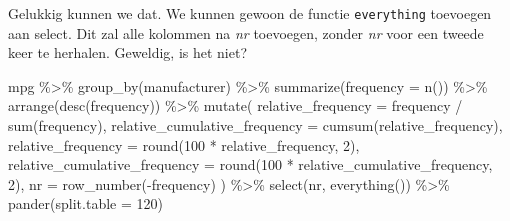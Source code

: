 \documentclass[]{tufte-book}
\newenvironment{Shaded}{}{}
\newcommand{\AttributeTok}[1]{\textcolor[rgb]{0.49,0.56,0.16}{#1}}
\newcommand{\DecValTok}[1]{\textcolor[rgb]{0.25,0.63,0.44}{#1}}
\newcommand{\FunctionTok}[1]{\textcolor[rgb]{0.02,0.16,0.49}{#1}}
\newcommand{\NormalTok}[1]{#1}
\newcommand{\SpecialCharTok}[1]{\textcolor[rgb]{0.25,0.44,0.63}{#1}}
\begin{document}
Gelukkig kunnen we dat. We kunnen gewoon de functie \texttt{everything} toevoegen aan select. Dit zal alle kolommen na \emph{nr} toevoegen, zonder \emph{nr} voor een tweede keer te herhalen. Geweldig, is het niet?

\begin{Shaded}
\begin{Highlighting}[]
\NormalTok{mpg }\SpecialCharTok{\%\textgreater{}\%}
  \FunctionTok{group\_by}\NormalTok{(manufacturer) }\SpecialCharTok{\%\textgreater{}\%}
  \FunctionTok{summarize}\NormalTok{(}\AttributeTok{frequency =} \FunctionTok{n}\NormalTok{()) }\SpecialCharTok{\%\textgreater{}\%}
  \FunctionTok{arrange}\NormalTok{(}\FunctionTok{desc}\NormalTok{(frequency)) }\SpecialCharTok{\%\textgreater{}\%}
  \FunctionTok{mutate}\NormalTok{(}
    \AttributeTok{relative\_frequency =}\NormalTok{ frequency }\SpecialCharTok{/} \FunctionTok{sum}\NormalTok{(frequency),}
    \AttributeTok{relative\_cumulative\_frequency =} \FunctionTok{cumsum}\NormalTok{(relative\_frequency),}
    \AttributeTok{relative\_frequency =} \FunctionTok{round}\NormalTok{(}\DecValTok{100} \SpecialCharTok{*}\NormalTok{ relative\_frequency, }\DecValTok{2}\NormalTok{),}
    \AttributeTok{relative\_cumulative\_frequency =} \FunctionTok{round}\NormalTok{(}\DecValTok{100} \SpecialCharTok{*}\NormalTok{ relative\_cumulative\_frequency, }\DecValTok{2}\NormalTok{),}
    \AttributeTok{nr =} \FunctionTok{row\_number}\NormalTok{(}\SpecialCharTok{{-}}\NormalTok{frequency)}
\NormalTok{  ) }\SpecialCharTok{\%\textgreater{}\%}
  \FunctionTok{select}\NormalTok{(nr, }\FunctionTok{everything}\NormalTok{()) }\SpecialCharTok{\%\textgreater{}\%}
  \FunctionTok{pander}\NormalTok{(}\AttributeTok{split.table =} \DecValTok{120}\NormalTok{)}
\end{Highlighting}
\end{Shaded}
\end{document}
